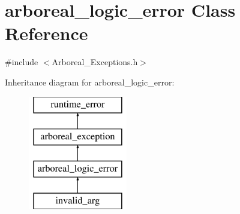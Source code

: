 \hypertarget{classarboreal__logic__error}{}\section{arboreal\+\_\+logic\+\_\+error Class Reference}
\label{classarboreal__logic__error}


{\ttfamily \#include $<$Arboreal\+\_\+\+Exceptions.\+h$>$}

Inheritance diagram for arboreal\+\_\+logic\+\_\+error\+:\begin{figure}[H]
\begin{center}
\leavevmode
\includegraphics[height=5.000000cm]{classarboreal__logic__error}
\end{center}
\end{figure}
